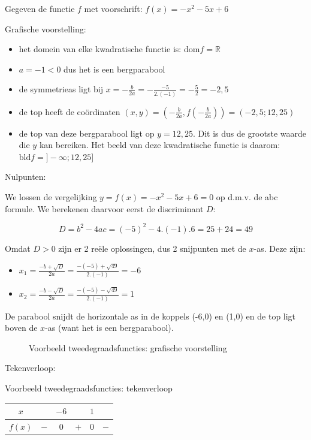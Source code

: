 \begin{voorbeeld}
	Gegeven de functie $f$ met voorschrift: $f(x)=-x^{2}-5x+6$ 

Grafische voorstelling:
\begin{itemize}
\item het domein van elke kwadratische functie is: $\textrm{dom}f=\mathbb{R}$
\item $a=-1<0$ dus het is een bergparabool
\item de symmetrieas ligt bij $x=-\frac{b}{2a}=-\frac{-5}{2.(-1)}=-\frac{5}{2}=-2,5$
\item de top heeft de co\"ordinaten $(x,y)=(-\frac{b}{2a},f(-\frac{b}{2a}))=(-2,5;12,25)$
\item de top van deze bergparabool ligt op $y=12,25$. Dit is dus de grootste
waarde die $y$ kan bereiken. Het beeld van deze kwadratische functie
is daarom: $\textrm{bld}f=]-\infty;12,25]$
\end{itemize}


Nulpunten:

We lossen de vergelijking $y=f(x)=-x^{2}-5x+6=0$ op d.m.v.
de abc formule. We berekenen daarvoor eerst de discriminant $D$:

\begin{equation*}
D=b^{2}-4ac=(-5)^{2}-4.(-1).6=25+24=49
\end{equation*}

Omdat $D>0$ zijn er 2 re\"ele oplossingen, dus 2 snijpunten
met de $x$-as. Deze zijn:
\begin{itemize}
\item $x_{1}=\frac{-b+\sqrt{D}}{2a}=\frac{-(-5)+\sqrt{49}}{2.(-1)}=-6$
\item $x_{2}=\frac{-b-\sqrt{D}}{2a}=\frac{-(-5)-\sqrt{49}}{2.(-1)}=1$
\end{itemize}
De parabool snijdt de horizontale as in de koppels (-6,0) en (1,0)
en de top ligt boven de $x$-as (want het is een bergparabool).

\begin{figure}[h]
\centering

\caption{Voorbeeld tweedegraadsfuncties: grafische voorstelling}
\label{fig:tweede:vb} 
\end{figure}


Tekenverloop:


\begin{tabel}{Voorbeeld tweedegraadsfuncties: tekenverloop}
\begin{tabular}{c||c|c|c|c|c}
	$x$ &  & $-6$ &  & $1$ & \\
	\hline 
	$f(x)$ & $-$ & 0 & $+$ & 0 & $-$\\
\end{tabular}
\label{tab:tweede:vb}	
\end{tabel}

\end{voorbeeld}